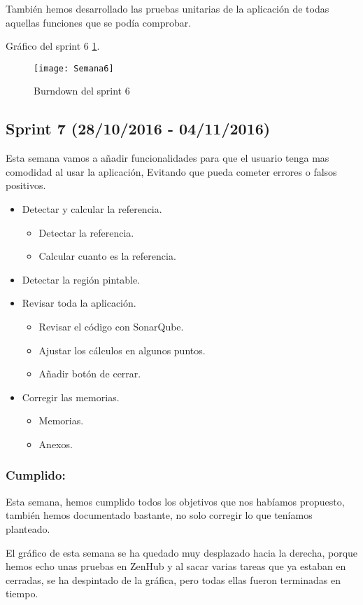 También hemos desarrollado las pruebas unitarias de la aplicación de todas aquellas funciones que se podía comprobar. 


Gráfico del sprint 6 \ref{fig:A.2.6}.
\begin{figure}[h]
\centering
\texttt{[image: Semana6]}
\caption{Burndown del sprint 6}
\label{fig:A.2.6}
\end{figure}

\subsection{Sprint 7 (28/10/2016 - 04/11/2016)}

Esta semana vamos a añadir funcionalidades para que el usuario tenga mas comodidad al usar la aplicación, Evitando que pueda cometer errores o falsos positivos.


\begin{itemize}
	\item Detectar y calcular la referencia.
		\begin{itemize}
			\item Detectar la referencia.
			\item Calcular cuanto es la referencia.
		\end{itemize}
	\item Detectar la región pintable.
	\item Revisar toda la aplicación.
		\begin{itemize}
			\item Revisar el código con SonarQube.
			\item Ajustar los cálculos en algunos puntos.
			\item Añadir botón de cerrar.
		\end{itemize}
	\item Corregir las memorias.
		\begin{itemize}
			\item Memorias.
			\item Anexos.
		\end{itemize}			
\end{itemize}
\subsubsection{Cumplido:}
Esta semana, hemos cumplido todos los objetivos que nos habíamos propuesto, también hemos documentado bastante, no solo corregir lo que teníamos planteado.

El gráfico de esta semana se ha quedado muy desplazado hacia la derecha, porque hemos echo unas pruebas en ZenHub y al sacar varias tareas que ya estaban en cerradas, se ha despintado de la gráfica, pero todas ellas fueron terminadas en tiempo.

